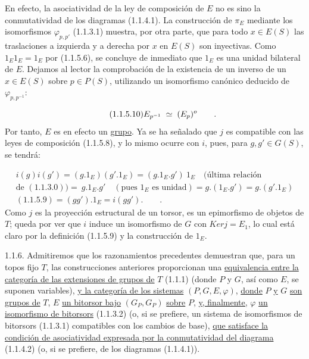 En efecto, la asociatividad de la ley de composición de $E$ no es sino
la conmutatividad de los diagramas (1.1.4.1). La construcción de
$\pi_E$ mediante los isomorfismos $\varphi_{p,p'}$ (1.1.3.1) muestra,
por otra parte, que para todo $x \in E(S)$ las traslaciones a izquierda
y a derecha por $x$ en $E(S)$ son inyectivas. Como
$1_E1_E = 1_E$ por (1.1.5.6), se concluye de inmediato que $1_E$ es una
unidad bilateral de $E$. Dejamos al lector la comprobación de la
existencia de un inverso de un $x \in E(S)$ sobre $p \in P(S)$,
utilizando un isomorfismo canónico deducido de
$\varphi_{p,p^{-1}}$:

\begin{equation}\tag{1.1.5.10}
\sisi{P_{p^{-1}}}{E_{p^{-1}}} \;\simeq\;
(\sisi{P_p}{E_p})^{o} \qquad .
\end{equation}
Por tanto, $E$ es en efecto un \underline{grupo}. Ya se ha señalado que
$j$ es compatible con las leyes de composición (1.1.5.8), y lo mismo
ocurre con $i$, pues, para $g,g' \in G(S)$, se tendrá:

\begin{multline*}
i(g)i(g') = (g.1_E)(g'.1_E) = (g.1_E.g')\ 1_E \quad (\text{última relación} \\ \text{de } (1.1.3.0)) = \ g.1_E.g' \quad (\text{pues } 1_E \text{ es unidad}) = g.(1_E.g') = g.(g'.1_E) \\ (1.1.5.9) = (gg').1_E = i(gg'). \qquad .
\end{multline*}
Como $j$ es la proyección estructural de un torsor, es un epimorfismo
de objetos de \underline{$T$}; queda por ver que $i$ induce un
isomorfismo de $G$ con $Ker j = E_1$, lo cual está claro por la
definición (1.1.5.9) y la construcción de $1_E$.



1.1.6.  Admitiremos que los razonamientos precedentes demuestran que,
para un topos fijo \underline{$T$}, las construcciones anteriores
proporcionan una \underline{equivalencia entre la categoría de las
extensiones de grupos de} \underline{$T$} (1.1.1) (donde $P$ y $G$,
así como $E$, se suponen variables), \underline{y la categoría de los
sistemas} $(P,G,E,\varphi)$, \underline{donde} $P$ \underline{y} $G$
\underline{son grupos de} \underline{$T$}, $E$ \underline{un bitorsor
bajo} $(G_P,G_P)$ \underline{sobre} $P$, \underline{y, finalmente,}
$\varphi$ \underline{un isomorfismo de bitorsors} (1.1.3.2) (o, si se
prefiere, un sistema de isomorfismos de bitorsors (1.1.3.1) compatibles
con los cambios de base), \underline{que satisface la condición de
asociatividad expresada por la conmutatividad del diagrama} (1.1.4.2)
(o, si se prefiere, de los diagramas (1.1.4.1)).

